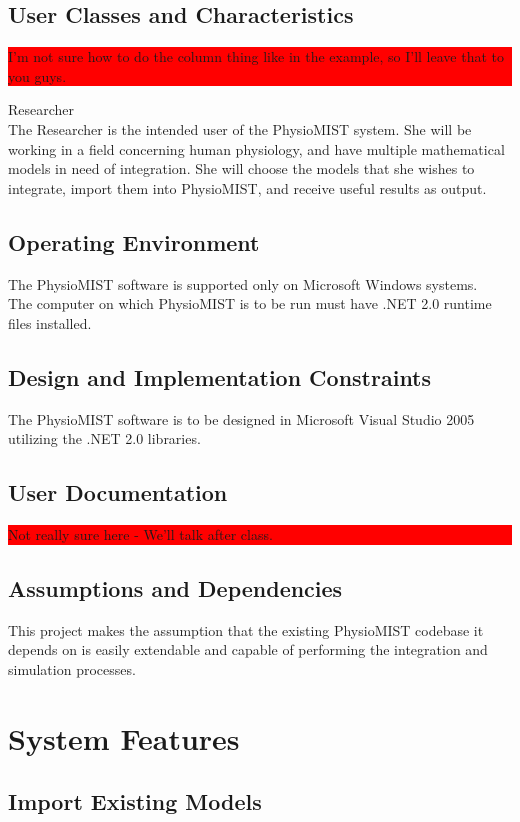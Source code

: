 \documentclass{article}
\newcommand{\todo}[1]{\colorbox{red}{\begin{minipage}{\textwidth}{#1}\end{minipage}}}
\begin{document}
\subsection{User Classes and Characteristics}
\todo{I'm not sure how to do the column thing like in the example, so I'll leave that to you guys.}
Researcher \\
The Researcher is the intended user of the PhysioMIST system. She will be working in a field concerning human physiology, and have multiple mathematical models in need of integration. She will choose the models that she wishes to integrate, import them into PhysioMIST, and receive useful results as output.

\subsection{Operating Environment}
The PhysioMIST software is supported only on Microsoft Windows systems. \\
The computer on which PhysioMIST is to be run must have .NET 2.0 runtime files installed. \\

\subsection{Design and Implementation Constraints}
The PhysioMIST software is to be designed in Microsoft Visual Studio 2005 utilizing the .NET 2.0 libraries.

\subsection{User Documentation}
\todo{Not really sure here - We'll talk after class.}

\subsection{Assumptions and Dependencies}
This project makes the assumption that the existing PhysioMIST codebase it depends on is easily extendable and capable of performing the integration and simulation processes.


\section{System Features}

\subsection{Import Existing Models}
\end{document}
